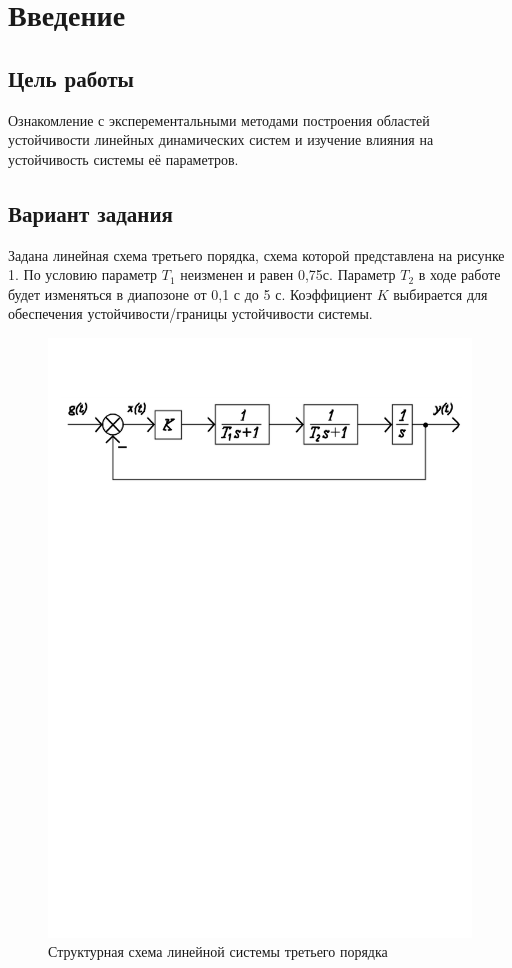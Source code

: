 \documentclass[a4paper, 11pt, russian]{article}
\begin{document}
    
    \section*{Введение}
    \subsection*{Цель работы}
    Ознакомление с эксперементальными методами построения областей устойчивости линейных динамических систем и изучение влияния на устойчивость системы её параметров.
    \subsection*{Вариант задания}
    Задана линейная схема третьего порядка, схема которой представлена на рисунке 1. По условию параметр $T_1$ неизменен и равен 0,75с. Параметр $T_2$ в ходе работе будет изменяться в диапозоне от 0,1 с до 5 с. Коэффициент $K$ выбирается для обеспечения устойчивости/границы устойчивости системы.
    \begin{figure}[h!]
        \centering
        \includegraphics[scale = 0.8]{structureScheme}
        \caption{Структурная схема линейной системы третьего порядка}
    \end{figure}
    \clearpage
\end{document}
